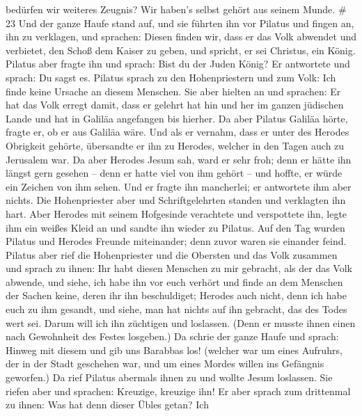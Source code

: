 bedürfen wir weiteres Zeugnis? Wir haben's selbst gehört aus seinem
Munde. \# 23  Und der ganze Haufe stand auf, und sie führten
ihn vor Pilatus  und fingen an, ihn zu verklagen, und
sprachen: Diesen finden wir, dass er das Volk abwendet und verbietet,
den Schoß dem Kaiser zu geben, und spricht, er sei Christus, ein König.
 Pilatus aber fragte ihn und sprach: Bist du der Juden
König? Er antwortete und sprach: Du sagst es.  Pilatus
sprach zu den Hohenpriestern und zum Volk: Ich finde keine Ursache an
diesem Menschen.  Sie aber hielten an und sprachen: Er hat
das Volk erregt damit, dass er gelehrt hat hin und her im ganzen
jüdischen Lande und hat in Galiläa angefangen bis hierher. 
Da aber Pilatus Galiläa hörte, fragte er, ob er aus Galiläa wäre.
 Und als er vernahm, dass er unter des Herodes Obrigkeit
gehörte, übersandte er ihn zu Herodes, welcher in den Tagen auch zu
Jerusalem war.  Da aber Herodes Jesum sah, ward er sehr
froh; denn er hätte ihn längst gern gesehen -- denn er hatte viel von
ihm gehört -- und hoffte, er würde ein Zeichen von ihm sehen.
 Und er fragte ihn mancherlei; er antwortete ihm aber
nichts.  Die Hohenpriester aber und Schriftgelehrten
standen und verklagten ihn hart.  Aber Herodes mit seinem
Hofgesinde verachtete und verspottete ihn, legte ihm ein weißes Kleid an
und sandte ihn wieder zu Pilatus.  Auf den Tag wurden
Pilatus und Herodes Freunde miteinander; denn zuvor waren sie einander
feind.  Pilatus aber rief die Hohenpriester und die
Obersten und das Volk zusammen  und sprach zu ihnen: Ihr
habt diesen Menschen zu mir gebracht, als der das Volk abwende, und
siehe, ich habe ihn vor euch verhört und finde an dem Menschen der
Sachen keine, deren ihr ihn beschuldiget;  Herodes auch
nicht, denn ich habe euch zu ihm gesandt, und siehe, man hat nichts auf
ihn gebracht, das des Todes wert sei.  Darum will ich ihn
züchtigen und loslassen.  (Denn er musste ihnen einen nach
Gewohnheit des Festes losgeben.)  Da schrie der ganze Haufe
und sprach: Hinweg mit diesem und gib uns Barabbas los! 
(welcher war um eines Aufruhrs, der in der Stadt geschehen war, und um
eines Mordes willen ins Gefängnis geworfen.)  Da rief
Pilatus abermals ihnen zu und wollte Jesum loslassen.  Sie
riefen aber und sprachen: Kreuzige, kreuzige ihn!  Er aber
sprach zum drittenmal zu ihnen: Was hat denn dieser Übles getan? Ich
